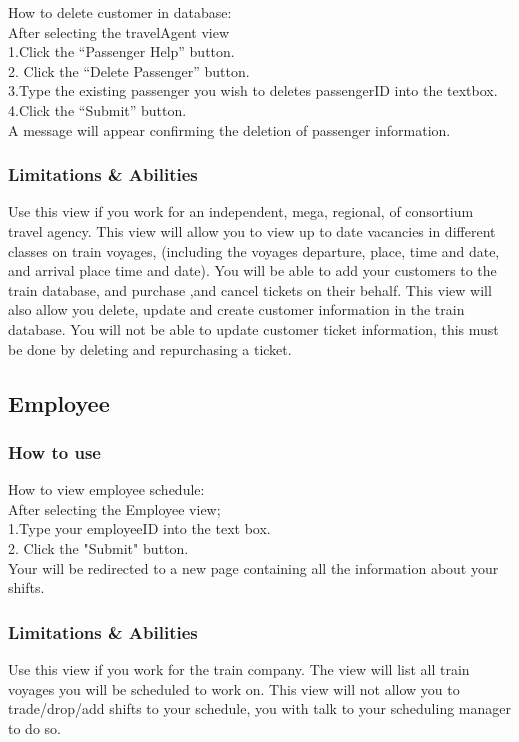 \documentclass[letter]{article}
\begin{document}
How to delete customer in database:\\
After selecting the travelAgent view \\ 
1.Click the “Passenger Help” button.\\
2. Click the “Delete Passenger” button.\\
3.Type the existing passenger you wish to deletes  passengerID into the textbox.\\
4.Click the “Submit” button. \\
A message will appear confirming the deletion of  passenger information.\\



\subsubsection{Limitations \& Abilities}
Use this view if you work for an independent, mega, regional, of consortium travel agency. This view will allow you to view up to date vacancies in different classes on train voyages, (including the voyages departure, place, time and date, and arrival place time and date).  You will be able to add your customers to the train database, and purchase ,and cancel tickets on their behalf. This view will also allow you delete, update and create customer information in the train database. You will not be able to update customer ticket information, this must be done by deleting and repurchasing a ticket. 


\subsection{Employee}
\subsubsection{How to use}
How to view employee schedule:\\
After selecting the Employee view;\\ 
1.Type your employeeID into the text box.\\
2. Click the "Submit" button. \\
Your will be redirected to a new page containing all the information about your shifts. \\


\subsubsection{Limitations \& Abilities}
Use this view if you work for the train company. The view will list all train voyages you will be scheduled to work on.  This view will not allow you to trade/drop/add shifts to your schedule, you with talk to your scheduling manager  to do so.
\end{document}
